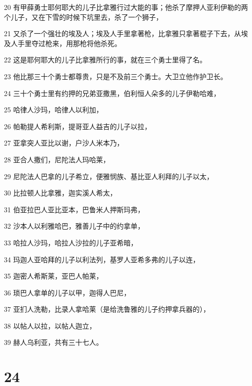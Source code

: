 \par 20 有甲薛勇士耶何耶大的儿子比拿雅行过大能的事；他杀了摩押人亚利伊勒的两个儿子，又在下雪的时候下坑里去，杀了一个狮子，
\par 21 又杀了一个强壮的埃及人；埃及人手里拿著枪，比拿雅只拿著棍子下去，从埃及人手里夺过枪来，用那枪将他杀死。
\par 22 这是耶何耶大的儿子比拿雅所行的事，就在三个勇士里得了名。
\par 23 他比那三十个勇士都尊贵，只是不及前三个勇士。大卫立他作护卫长。
\par 24 三十个勇士里有约押的兄弟亚撒黑，伯利恒人朵多的儿子伊勒哈难，
\par 25 哈律人沙玛，哈律人以利加，
\par 26 帕勒提人希利斯，提哥亚人益吉的儿子以拉，
\par 27 亚拿突人亚比以谢，户沙人米本乃，
\par 28 亚合人撒们，尼陀法人玛哈莱，
\par 29 尼陀法人巴拿的儿子希立，便雅悯族、基比亚人利拜的儿子以太，
\par 30 比拉顿人比拿雅，迦实溪人希太，
\par 31 伯亚拉巴人亚比亚本，巴鲁米人押斯玛弗，
\par 32 沙本人以利雅哈巴，雅善儿子中的约拿单，
\par 33 哈拉人沙玛，哈拉人沙拉的儿子亚希暗，
\par 34 玛迦人亚哈拜的儿子以利法列，基罗人亚希多弗的儿子以连，
\par 35 迦密人希斯莱，亚巴人帕莱，
\par 36 琐巴人拿单的儿子以甲，迦得人巴尼，
\par 37 亚扪人洗勒，比录人拿哈莱（是给洗鲁雅的儿子约押拿兵器的），
\par 38 以帖人以拉，以帖人迦立，
\par 39 赫人乌利亚，共有三十七人。

\chapter{24}

